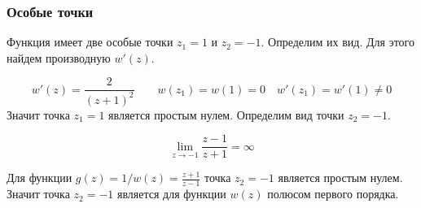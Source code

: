 
\begin{frame}\frametitle{Особые точки}
	Функция имеет две особые точки \(z_1 = 1\) и \(z_2 = -1\).
	Определим их вид.
	Для этого найдем производную \(w'(z)\).

	\[
		w'(z) = \frac{2}{(z+1)^2}
		\qquad
		w(z_1) = w(1) = 0
		\quad
		w'(z_1) = w'(1) \neq 0
	\]
	Значит точка \(z_1 = 1\) является простым нулем.
	Определим вид точки \(z_2 = -1\).

	\[ \lim_{z \to -1} \frac{z-1}{z+1} = \infty \]

	Для функции \(g(z) = 1/w(z) = \frac{z+1}{z-1}\)
	точка \(z_2 = -1\) является простым нулем.
	Значит точка \(z_2 = -1\) является для функции \(w(z)\) полюсом первого порядка.

\end{frame}


